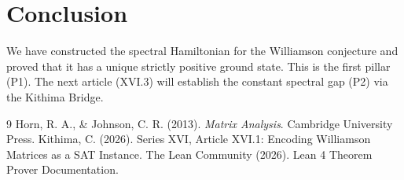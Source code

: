 \documentclass[11pt,a4paper]{article}
\begin{document}
\section{Conclusion}

We have constructed the spectral Hamiltonian for the Williamson conjecture and proved that it has a unique strictly positive ground state. This is the first pillar (P1). The next article (XVI.3) will establish the constant spectral gap (P2) via the Kithima Bridge.


\begin{thebibliography}{9}
  Horn, R. A., \& Johnson, C. R. (2013). \emph{Matrix Analysis}. Cambridge University Press.
  Kithima, C. (2026). Series XVI, Article XVI.1: Encoding Williamson Matrices as a SAT Instance.
  The Lean Community (2026). Lean 4 Theorem Prover Documentation.
\end{thebibliography}
\end{document}
